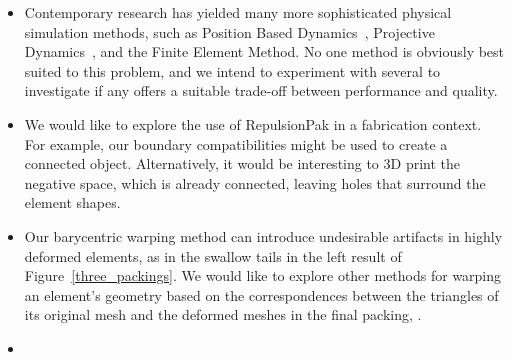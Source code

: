 \begin{itemize}
\item 
{}
	Contemporary research has yielded many more sophisticated 
	physical simulation methods, such as Position Based Dynamics~\cite{Muller2007}, 
	Projective Dynamics~\cite{Bouaziz2014}, and the Finite Element Method.
	No one method is obviously best suited to this problem, and
	we intend to experiment with several to investigate if any offers
	a suitable trade-off between performance and quality.

\item {} 
We would like to explore the use of RepulsionPak in a fabrication context.
      For example, our boundary compatibilities might be used to create a connected object.
      Alternatively, it would be interesting to 3D print the 
      negative space, which is already connected,
	  leaving holes that surround the element shapes.

\item {}
Our barycentric warping method can
	introduce undesirable artifacts in highly deformed elements, as
	in the swallow tails in the left result of Figure~\ref{three_packings}.
	We would like to explore other methods for warping an element's
	geometry based on the correspondences between the triangles of its original
	mesh and the deformed meshes in the final packing, .


\item {}

\end{itemize}

